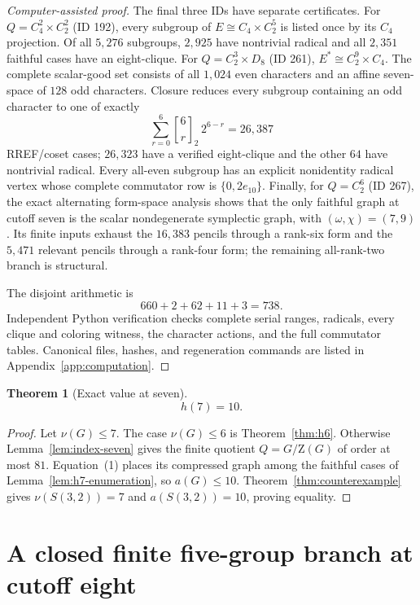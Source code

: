 \documentclass[11pt]{article}
\newtheorem{theorem}{Theorem}[section]
\theoremstyle{remark}
\newcommand{\nuG}{\nu}
\newcommand{\aG}{a}
\newcommand{\Z}{\mathrm Z}
\begin{document}
\begin{proof}[Computer-assisted proof]
The final three IDs have separate certificates.  For
$Q=C_4^2\times C_2^2$ (ID 192), every subgroup of
$E\cong C_4\times C_2^5$ is listed once by its $C_4$ projection.  Of all
$5{,}276$ subgroups, $2{,}925$ have nontrivial radical and all $2{,}351$
faithful cases have an eight-clique.  For
$Q=C_2^3\times D_8$ (ID 261), $E^*\cong C_2^9\times C_4$.  The complete
scalar-good set consists of all $1{,}024$ even characters and an affine
seven-space of $128$ odd characters.  Closure reduces every subgroup
containing an odd character to one of exactly
\[
 \sum_{r=0}^{6}{6\brack r}_2\,2^{6-r}=26{,}387
\]
RREF/coset cases; $26{,}323$ have a verified eight-clique and the other
$64$ have nontrivial radical.  Every all-even subgroup has an explicit
nonidentity radical vertex whose complete commutator row is
$\{0,2e_{10}\}$.  Finally, for $Q=C_2^6$ (ID 267), the exact alternating
form-space analysis shows that the only faithful graph at cutoff seven is
the scalar nondegenerate symplectic graph, with
$(\omega,\chi)=(7,9)$.  Its finite inputs exhaust the $16{,}383$ pencils
through a rank-six form and the $5{,}471$ relevant pencils through a
rank-four form; the remaining all-rank-two branch is structural.

The disjoint arithmetic is
\[
660+2+62+11+3=738.
\]
Independent Python verification checks complete serial ranges, radicals,
every clique and coloring witness, the character actions, and the full
commutator tables.  Canonical files, hashes, and regeneration commands are
listed in Appendix~\ref{app:computation}.
\end{proof}

\begin{theorem}[Exact value at seven]\label{thm:h7}
\[
 h(7)=10.
\]
\end{theorem}

\begin{proof}
Let $\nuG(G)\le7$.  The case $\nuG(G)\le6$ is
Theorem~\ref{thm:h6}.  Otherwise Lemma~\ref{lem:index-seven} gives the
finite quotient $Q=G/\Z(G)$ of order at most $81$.  Equation~(1) places its
compressed graph among the faithful cases of
Lemma~\ref{lem:h7-enumeration}, so $\aG(G)\le10$.  Theorem~\ref{thm:counterexample}
gives $\nuG(S(3,2))=7$ and $\aG(S(3,2))=10$, proving equality.
\end{proof}

\section{A closed finite five-group branch at cutoff eight}
\end{document}
